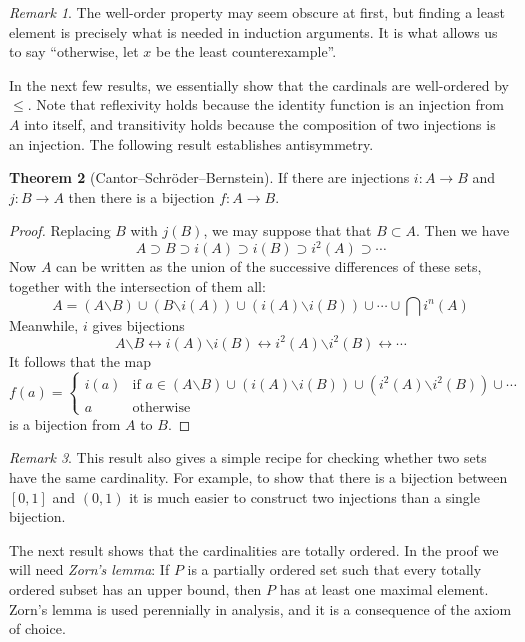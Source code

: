 \documentclass[11pt,oneside]{amsart}
\theoremstyle{definition}
\newtheorem{thm}{Theorem}[section]
\theoremstyle{definition}
\theoremstyle{remark}
\newtheorem{rem}[thm]{Remark}
\begin{document}
\begin{rem}
  The well-order property may seem obscure at first, but finding a least element is precisely what is needed in induction arguments. It is what allows us to say ``otherwise, let $x$ be the least counterexample''.
\end{rem}

In the next few results, we essentially show that the cardinals are well-ordered by $\leq$. Note that reflexivity holds because the identity function is an injection from $A$ into itself, and transitivity holds because the composition of two injections is an injection. The following result establishes antisymmetry.

\begin{thm}[Cantor--Schr\"oder--Bernstein]
  If there are injections $i\colon A\to B$ and $j\colon B\to A$ then there is a bijection $f\colon A\to B$.
\end{thm}

\begin{proof}
  Replacing $B$ with $j(B)$, we may suppose that that $B\subset A$. Then we have
\[A\supset B\supset i(A)\supset i(B)\supset i^2(A)\supset\cdots
\]
Now $A$ can be written as the union of the successive differences of these sets, together with the intersection of them all:
\[A=(A\mathord{\smallsetminus}B)\cup(B\mathord{\smallsetminus}i(A))\cup(i(A)\mathord{\smallsetminus}i(B))\cup\cdots\cup \bigcap i^n(A)
\]
Meanwhile, $i$ gives bijections
\[A\mathord{\smallsetminus}B\leftrightarrow i(A)\mathord{\smallsetminus}i(B)\leftrightarrow i^2(A)\mathord{\smallsetminus}i^2(B)\leftrightarrow\cdots
\]
It follows that the map
\[f(a)=\begin{cases}i(a)&\text{if }a\in(A\mathord{\smallsetminus}B)\cup(i(A)\mathord{\smallsetminus}i(B))\cup(i^2(A)\mathord{\smallsetminus}i^2(B))\cup\cdots\\
a&\text{otherwise}
\end{cases}
\]
is a bijection from $A$ to $B$.
\end{proof}

\begin{rem}
  This result also gives a simple recipe for checking whether two sets have the same cardinality. For example, to show that there is a bijection between $[0,1]$ and $(0,1)$ it is much easier to construct two injections than a single bijection.
\end{rem}

The next result shows that the cardinalities are totally ordered. In the proof we will need \emph{Zorn's lemma}: If $P$ is a partially ordered set such that every totally ordered subset has an upper bound, then $P$ has at least one maximal element.  Zorn's lemma is used perennially in analysis, and it is a consequence of the axiom of choice.
\end{document}
